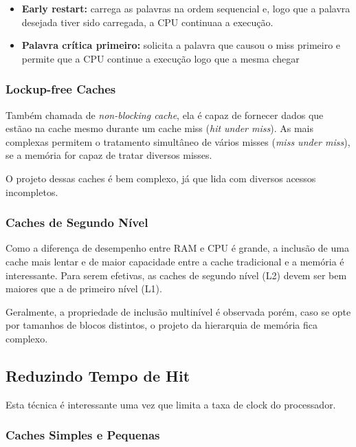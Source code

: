 \begin{itemize}
  \item \textbf{Early restart:} carrega as palavras na ordem sequencial e, logo que a palavra desejada tiver sido carregada, a CPU continuaa a execução.

  \item \textbf{Palavra crítica primeiro:} solicita a palavra que causou o miss primeiro e permite que a CPU continue a execução logo que a mesma chegar
\end{itemize}



\subsubsection{Lockup-free Caches}
Também chamada de \textit{non-blocking cache}, ela é capaz de fornecer dados que estãao na cache mesmo durante um cache miss (\textit{hit under miss}). As mais complexas permitem o tratamento simultâneo de vários misses (\textit{miss under miss}), se a memória for capaz de tratar diversos misses.

O projeto dessas caches é bem complexo, já que lida com diversos acessos incompletos.



\subsubsection{Caches de Segundo Nível}
Como a diferença de desempenho entre RAM e CPU é grande, a inclusão de uma cache mais lentar e de maior capacidade entre a cache tradicional e a memória é interessante. Para serem efetivas, as caches de segundo nível (L2) devem ser bem maiores que a de primeiro nível (L1).

Geralmente, a propriedade de inclusão multinível é observada porém, caso se opte por tamanhos de blocos distintos, o projeto da hierarquia de memória fica complexo.






\subsection{Reduzindo Tempo de Hit}
Esta técnica é interessante uma vez que limita a taxa de clock do processador.


\subsubsection{Caches Simples e Pequenas}




